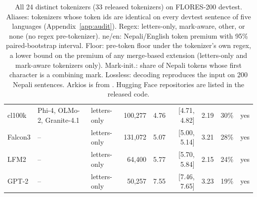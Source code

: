 \begin{table}[t]
\begin{tabular}{lllrrrrrl}
cl100k & Phi-4, OLMo-2, Granite-4.1 & letters-only & 100,277 & 4.76 & [4.71, 4.82] & 2.19 & 30\% & yes \\
Falcon3 & -- & letters-only & 131,072 & 5.07 & [5.00, 5.14] & 3.21 & 28\% & yes \\
LFM2 & -- & letters-only & 64,400 & 5.77 & [5.70, 5.84] & 2.15 & 24\% & yes \\
GPT-2 & -- & letters-only & 50,257 & 7.55 & [7.46, 7.65] & 3.23 & 19\% & yes \\
\bottomrule
\end{tabular}
\caption{All 24 distinct tokenizers (33 released tokenizers) on FLORES-200 devtest. Aliases: tokenizers whose token ids are identical on every devtest sentence of five languages (Appendix~\ref{app:audit}). Regex: letters-only, mark-aware, other, or none (no regex pre-tokenizer). ne/en: Nepali/English token premium with 95\% paired-bootstrap interval. Floor: pre-token floor under the tokenizer's own regex, a lower bound on the premium of any merge-based extension (letters-only and mark-aware tokenizers only). Mark-init.: share of Nepali tokens whose first character is a combining mark. Lossless: decoding reproduces the input on 200 Nepali sentences. Arkios is from \citet{regmi2026arkios}. Hugging Face repositories are listed in the released code.}
\label{tab:audit-full}
\end{table}

